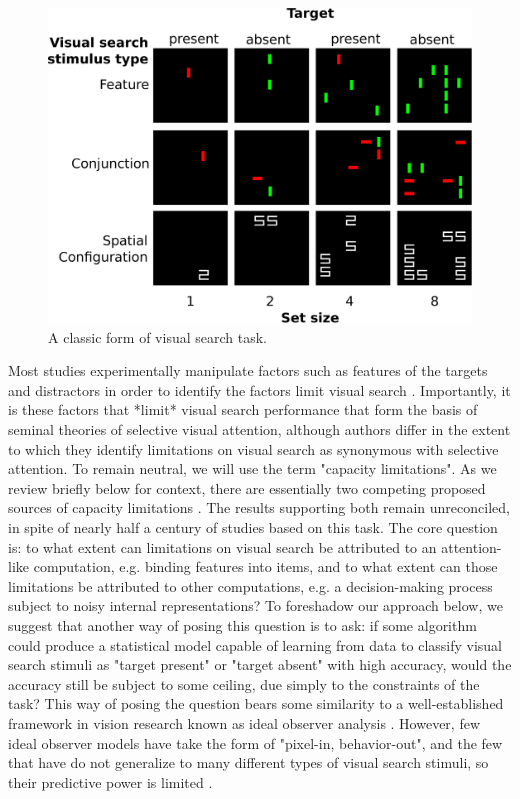 \documentclass[10pt,letterpaper]{article}
\begin{document}
\begin{figure}[ht]
\begin{center}
\includegraphics[width=\columnwidth]{fig1/fig1.eps}
\end{center}
\caption{A classic form of visual search task.} 
\label{fig1}
\end{figure}

Most studies experimentally manipulate factors such as features of the targets and 
distractors in order to identify the factors limit visual search 
\cite{ecksteinVisualSearchRetrospective2011,wolfeFiveFactorsThat2017}.
Importantly, it is these factors that *limit* visual search performance that form the 
basis of seminal theories of selective visual attention, although authors differ in the 
extent to which they identify limitations on visual search as synonymous with selective 
attention. To remain neutral, we will use the term "capacity limitations". 
As we review briefly below for context, there are essentially two competing proposed 
sources of capacity limitations \cite{palmerSignalDetectionEvidence2011}. 
The results supporting both remain unreconciled, in spite of nearly half a century of 
studies based on this task. The core question is: to 
what extent can limitations on visual search be attributed to an attention-like 
computation, e.g. binding features into items, and to what extent can those limitations be 
attributed to other computations, e.g. a decision-making process subject to  
noisy internal representations?
To foreshadow our approach below, we suggest that another way of posing this question is 
to ask: if some algorithm could produce a statistical model capable of learning from data 
to classify visual search stimuli as "target present" or "target absent" with high 
accuracy, would the accuracy still be subject to some ceiling, due simply to the 
constraints of the task? This way of posing the question bears some similarity to a 
well-established framework in vision research known as ideal observer analysis 
\cite{geislerIdealObserverAnalysis2003}. However, few ideal observer models have take the 
form of "pixel-in, behavior-out", and the few that have do not generalize to many 
different types of visual search stimuli, so their predictive power is limited 
\cite{geislerModelsOvertAttention2011}.
\end{document}
